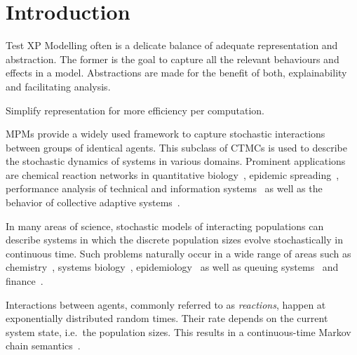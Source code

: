 \chapter{Introduction}



\textsf{Test}
XP
Modelling often is a delicate balance of adequate representation and abstraction.
The former is the goal to capture all the relevant behaviours and effects in a model.
Abstractions are made for the benefit of both, explainability and facilitating analysis.

Simplify representation for more efficiency per computation.



\Acfp{MPM} provide a
widely used framework to capture stochastic interactions between groups of identical agents.
This subclass of \acfp{CTMC}  is used
to describe the stochastic dynamics of systems in various domains.
Prominent applications are chemical reaction networks in quantitative
biology~\parencite{BuchWolkenhauer},
epidemic spreading~\parencite{porter2016dynamical}, performance analysis  of technical and
information systems~\parencite{bortolussi2013continuous,gast2019} as well as the behavior of
collective adaptive systems~\parencite{bernardo2016}.








In many areas of science, stochastic models  of interacting populations can describe systems in which the discrete population sizes evolve stochastically in continuous time.
Such problems naturally occur in a wide range of areas such as chemistry~\parencite{gillespie1977exact}, systems biology~\parencite{wilkinson2018stochastic,ullah2011stochastic}, epidemiology~\parencite{mode2000stochastic} as well as    queuing systems~\parencite{breuer2003markov} and finance~\parencite{pardoux2008markov}.

Interactions between agents, commonly referred to as \emph{reactions}, happen at exponentially distributed random times. 
Their rate depends on the current system state, i.e.\ the population sizes.
This results in a continuous-time Markov chain semantics~\parencite{anderson2012continuous}.






